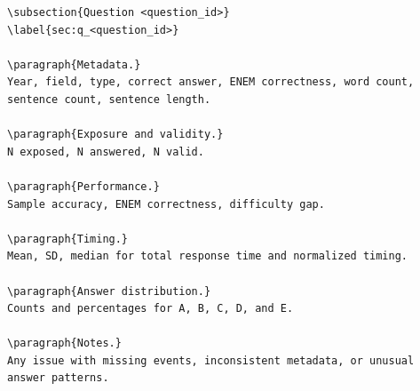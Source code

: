 \documentclass[11pt]{article}
\begin{document}
\begin{verbatim}
\subsection{Question <question_id>}
\label{sec:q_<question_id>}

\paragraph{Metadata.}
Year, field, type, correct answer, ENEM correctness, word count, sentence count, sentence length.

\paragraph{Exposure and validity.}
N exposed, N answered, N valid.

\paragraph{Performance.}
Sample accuracy, ENEM correctness, difficulty gap.

\paragraph{Timing.}
Mean, SD, median for total response time and normalized timing.

\paragraph{Answer distribution.}
Counts and percentages for A, B, C, D, and E.

\paragraph{Notes.}
Any issue with missing events, inconsistent metadata, or unusual answer patterns.
\end{verbatim}
\end{document}
